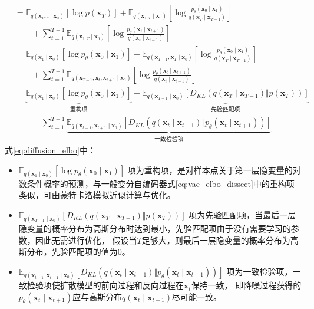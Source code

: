 \begin{align}
    \\ & = \mathbb{E}_{q(\bm{x}_{1:T}\mid \bm{x}_{0})} \left[   \log  p(\bm{x}_{T})\right]
    + \mathbb{E}_{q(\bm{x}_{1:T}\mid \bm{x}_{0})} \left[   \log  \frac{p_{\theta}(\bm{x}_{0} \mid \bm{x}_1)  }{q(\bm{x}_{T}\mid \bm{x}_{T-1})}     \right]
    \nonumber \\ &\qquad+ \sum_{t=1}^{T-1} \mathbb{E}_{q(\bm{x}_{1:T}\mid \bm{x}_{0})} \left[    { \log \frac{p_{\theta}(\bm{x}_{t}\mid \bm{x}_{t+1})} {q(\bm{x}_{t}\mid \bm{x}_{t-1})} }     \right]
    \\ & = \mathbb{E}_{q(\bm{x}_{1}\mid \bm{x}_{0})} \left[  \log  p_{\theta}(\bm{x}_{0}\mid \bm{x}_{1})\right]
    + \mathbb{E}_{q(\bm{x}_{T-1},\bm{x}_{T}\mid \bm{x}_{0})} \left[   \log  \frac{p_{\theta}(\bm{x}_{0} \mid \bm{x}_1)  }{q(\bm{x}_{T}\mid \bm{x}_{T-1})}     \right]
    \nonumber \\ & \qquad+ \sum_{t=1}^{T-1} \mathbb{E}_{q(\bm{x}_{T-1},\bm{x}_{t},\bm{x}_{t+1}\mid \bm{x}_{0})} \left[    { \log \frac{p_{\theta}(\bm{x}_{t}\mid \bm{x}_{t+1})} {q(\bm{x}_{t}\mid \bm{x}_{t-1})} }     \right]
    \\ & = \underbrace{\mathbb{E}_{q(\bm{x}_{1}\mid \bm{x}_{0})} \left[   \log  p_{\theta}(\bm{x}_{0}\mid \bm{x}_{1})\right]}_{\mbox{重构项}}
    - \underbrace{\mathbb{E}_{q(\bm{x}_{T-1}\mid \bm{x}_{0})}{\left[D_{KL}(q(\bm{x}_{T}\mid \bm{x}_{T-1}) \Vert p(\bm{x}_{T}) )\right]}}_{\mbox{先验匹配项}}
    \nonumber \\ & \qquad - \sum_{t=1}^{T-1} \underbrace{\mathbb{E}_{q(\bm{x}_{t-1},\bm{x}_{t+1}\mid \bm{x}_0)} \left[ D_{KL}( q(\bm{x}_{t}\mid\bm{x}_{t-1} )  \Vert  p_{\theta}(\bm{x}_{t}\mid \bm{x}_{t+1})   )  \right]    }_{\mbox{一致检验项}} \label{eq:diffusion_elbo}
\end{align}
式{\ref{eq:diffusion_elbo}}中：
\begin{itemize}
    \item {$\mathbb{E}_{q(\bm{x}_{1}\mid \bm{x}_{0})} \left[   \log  p_{\theta}(\bm{x}_{0}\mid \bm{x}_{1})\right]$}
项为重构项，是对样本点关于第一层隐变量的对数条件概率的预测，与一般变分自编码器式{\ref{eq:vae_elbo_dissect}}中的重构项类似，可由蒙特卡洛模拟近似计算与优化。
    \item {$\mathbb{E}_{q(\bm{x}_{T-1}\mid \bm{x}_{0})}{\left[D_{KL}(q(\bm{x}_{T}\mid \bm{x}_{T-1}) \Vert p(\bm{x}_{T}) )\right]}$}
项为先验匹配项，当最后一层隐变量的概率分布为高斯分布时达到最小，先验匹配项由于没有需要学习的参数，因此无需进行优化，
假设当{$T$}足够大，则最后一层隐变量的概率分布为高斯分布，先验匹配项的值为{$0$}。
    \item {$\mathbb{E}_{q(\bm{x}_{t-1},\bm{x}_{t+1}\mid \bm{x}_0)} \left[ D_{KL}( q(\bm{x}_{t}\mid\bm{x}_{t-1} )  \Vert  p_{\theta}(\bm{x}_{t}\mid \bm{x}_{t+1})   )  \right]     $}
项为一致检验项，一致检验项使扩散模型的前向过程和反向过程在{$\bm{x}_{t}$}保持一致，
即降噪过程获得的{$p_{\theta}(\bm{x}_{t}\mid \bm{x}_{t+1})$}应与高斯分布{$q(\bm{x}_{t}\mid \bm{x}_{t-1})$}尽可能一致。
\end{itemize}
